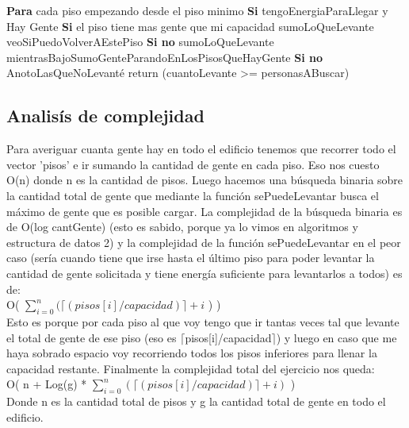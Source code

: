 \begin{codebox}
\li 		\textbf{Para} cada piso empezando desde el piso minimo \Do
\li			\textbf{Si} tengoEnergiaParaLlegar y Hay Gente \Do
\li				\textbf{Si} el piso tiene mas gente que mi capacidad \Do
\li					sumoLoQueLevante
\li					veoSiPuedoVolverAEstePiso \End
\li				\textbf{Si no} \Do
\li					sumoLoQueLevante
\li					mientrasBajoSumoGenteParandoEnLosPisosQueHayGente \End \End
\li			\textbf{Si no} \Do
\li				AnotoLasQueNoLevanté \End \End
\li		return (cuantoLevante >= personasABuscar)
\end{codebox}


\subsection{Analisís de complejidad}	
Para averiguar cuanta gente hay en todo el edificio tenemos que recorrer todo el vector 'pisos' e ir sumando la cantidad de gente en cada piso. Eso nos cuesto O(n) donde n es la cantidad de pisos. Luego hacemos una búsqueda binaria sobre la cantidad total de gente que mediante la función sePuedeLevantar busca el máximo de gente que es posible cargar. La complejidad de la búsqueda binaria es de O(log cantGente) (esto es sabido, porque ya lo vimos en algoritmos y estructura de datos 2) y la complejidad de la función sePuedeLevantar en el peor caso (sería cuando tiene que irse hasta el último piso para poder levantar la cantidad de gente solicitada y tiene energía suficiente para levantarlos a todos) es de: \\
	O( $\sum\limits_{i=0}^{n} { ( \lceil (pisos[i]/capacidad) \rceil  + i}$ ) ) \\
Esto es porque por cada piso al que voy tengo que ir tantas veces tal que levante el total de gente de ese piso (eso es $\lceil$pisos[i]/capacidad$\rceil$) y luego en caso que me haya sobrado espacio voy recorriendo todos los pisos inferiores para llenar la capacidad restante.
Finalmente la complejidad total del ejercicio nos queda:\\
O( n + Log(g) * $\sum\limits_{i=0}^{n} { ( \lceil (pisos[i]/capacidad) \rceil  + i ) }$ ) \\
Donde n es la cantidad total de pisos y g la cantidad total de gente en todo el edificio.

